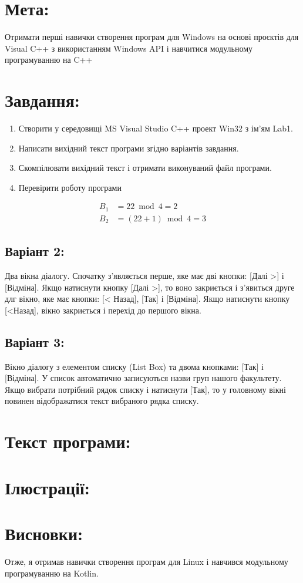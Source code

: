 \documentclass[14pt]{article}
\begin{document}

\tableofcontents
\newpage

\section{Мета:}
Отримати перші навички створення програм для Windows на
основі проєктів для Visual C++ з використанням Windows API і навчитися
модульному програмуванню на C++
\section{Завдання:}
\begin{enumerate}
    \item Створити у середовищі MS Visual Studio C++ проект Win32 з ім’ям Lab1.
    \item Написати вихідний текст програми згідно варіантів завдання.
    \item Скомпілювати вихідний текст і отримати виконуваний файл програми.
    \item Перевірити роботу програми
\end{enumerate}

\begin{align}
    B_1 &= 22 \bmod 4 = 2 \\
    B_2 &= (22+1) \bmod 4 = 3    
\end{align}

\subsection{Варіант 2:}
Два вікна діалогу. Спочатку
з’являється перше, яке має дві
кнопки: [Далі >] і [Відміна].
Якщо натиснути кнопку [Далі
>], то воно закриється і
з’явиться друге длг вікно, яке
має кнопки: [< Назад], [Так] і
[Відміна]. Якщо натиснути
кнопку [<Назад], вікно
закриється і перехід до
першого вікна.
\subsection{Варіант 3:}
Вікно діалогу з елементом
списку (List Box) та двома
кнопками: [Так] і [Відміна]. У
список автоматично
записуються назви груп
нашого факультету. Якщо
вибрати потрібний рядок
списку і натиснути [Так], то у
головному вікні повинен
відображатися текст
вибраного рядка списку.

\section{Текст програми:}


\section{Ілюстрації:}


\section{Висновки:}
Отже, я отримав навички створення програм для Linux і навчився модульному програмуванню на Kotlin.
\end{document}
